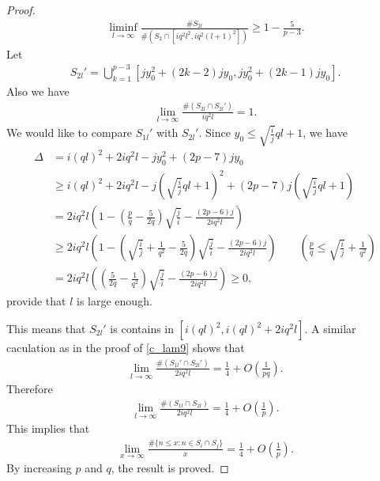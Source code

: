 \documentclass[a4paper,10pt]{amsart}
\begin{document}
\begin{proof}
\begin{align*}
       \liminf\limits_{l \rightarrow \infty}\frac{\# S_{2l}}
       {\#(S_2 \cap [iq^2l^2, iq^2(l+1)^2])} \geq 1 - \frac{5}{p-3}.
   \end{align*}
   Let 
   \begin{align*}
       S_{2l}' = \bigcup_{k=1}^{p-3}[jy_{0}^2 + (2k-2)jy_{0}, 
       jy_{0}^{2}+(2k-1)jy_{0}].
   \end{align*}
   Also we have
   \begin{align*}
       \lim_{l \rightarrow \infty} \frac{\# (S_{2l} \cap S_{2l}')}{iq^2l} = 1. 
   \end{align*}
   We would like to compare $S_{1l}'$ with $S_{2l}'$.
   Since $y_0 \leq \sqrt{\frac{i}{j}}ql +1$, we have
   \begin{align*}
       \Delta &= i(ql)^2 + 2iq^2l - jy_{0}^2 + (2p-7)jy_0\\ 
       &\geq i(ql)^2 + 2iq^2l - j(\sqrt{\frac{i}{j}}ql +1)^2
       + (2p -7)j(\sqrt{\frac{i}{j}}ql +1)\\
       & = 2iq^2l(1 - (\frac{p}{q}-\frac{5}{2q})\sqrt{\frac{j}{i}} 
       - \frac{(2p - 6)j}{2iq^2l})\\ 
       & \geq 2iq^2l(1 - (\sqrt{\frac{i}{j}} + \frac{1}{q^2} - \frac{5}{2q}) 
       \sqrt{\frac{j}{i}} - \frac{(2p - 6)j}{2iq^2l}) \qquad 
       (\frac{p}{q} \leq \sqrt{\frac{i}{j}} + \frac{1}{q^2})\\
        & = 2iq^2l((\frac{5}{2q}- \frac{1}{q^2}) 
        \sqrt{\frac{j}{i}} - \frac{(2p - 6)j}{2iq^2l}) \geq 0,
   \end{align*}
   provide that $l$ is large enough.
   
   This means that $S_{2l}'$ is contains in $[i(ql)^2, i(ql)^2 + 2iq^2l]$.
   A similar caculation as in the proof of \cref{c_lam9} shows that 
   \begin{align*}
       \lim_{l \rightarrow \infty} \frac{\#(S_{1l}' \cap S_{2l}')}{2iq^2l} = 
       \frac{1}{4} + O(\frac{1}{pq}).
   \end{align*}
   Therefore 
   \begin{align*}
       \lim_{l \rightarrow \infty} \frac{\#(S_{1l} \cap S_{2l})}{2iq^2l}
       = \frac{1}{4} + O(\frac{1}{p}).
   \end{align*}
   This implies that
    \begin{align*}
        \lim_{x \rightarrow \infty} 
        \frac{\# \{n \leq x: n \in S_{i} \cap S_{j}\}}{x} = \frac{1}{4} 
        + O(\frac{1}{p}).
    \end{align*}
   By increasing $p$ and $q$, the result is proved.
\end{proof}
\end{document}
